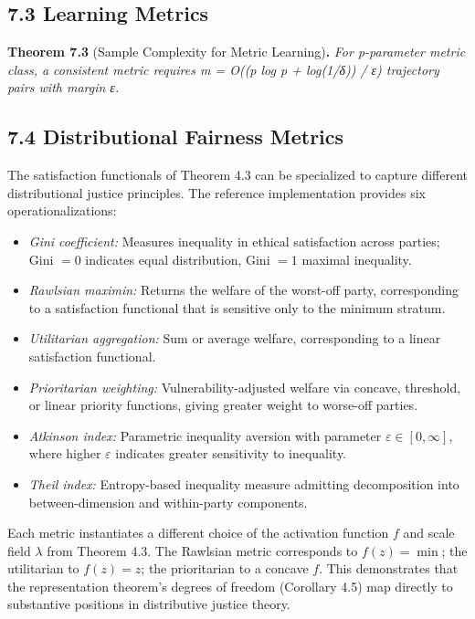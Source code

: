 \documentclass[12pt]{article}
\theoremstyle{plain}
\theoremstyle{definition}
\theoremstyle{remark}
\begin{document}
\subsection{7.3 Learning Metrics}\label{learning-metrics}

\textbf{Theorem 7.3} (Sample Complexity for Metric Learning)\textbf{.}
\emph{For p-parameter metric class, a consistent metric requires m =
O((p log p + log(1/δ)) / ε) trajectory pairs with margin ε.}

\subsection{7.4 Distributional Fairness Metrics}\label{distributional-fairness}

The satisfaction functionals of Theorem 4.3 can be specialized to capture different distributional justice principles. The reference implementation provides six operationalizations:

\begin{itemize}
\item \emph{Gini coefficient:} Measures inequality in ethical satisfaction across parties; Gini $= 0$ indicates equal distribution, Gini $= 1$ maximal inequality.
\item \emph{Rawlsian maximin:} Returns the welfare of the worst-off party, corresponding to a satisfaction functional that is sensitive only to the minimum stratum.
\item \emph{Utilitarian aggregation:} Sum or average welfare, corresponding to a linear satisfaction functional.
\item \emph{Prioritarian weighting:} Vulnerability-adjusted welfare via concave, threshold, or linear priority functions, giving greater weight to worse-off parties.
\item \emph{Atkinson index:} Parametric inequality aversion with parameter $\varepsilon \in [0, \infty]$, where higher $\varepsilon$ indicates greater sensitivity to inequality.
\item \emph{Theil index:} Entropy-based inequality measure admitting decomposition into between-dimension and within-party components.
\end{itemize}

Each metric instantiates a different choice of the activation function $f$ and scale field $\lambda$ from Theorem 4.3. The Rawlsian metric corresponds to $f(z) = \min$; the utilitarian to $f(z) = z$; the prioritarian to a concave $f$. This demonstrates that the representation theorem's degrees of freedom (Corollary 4.5) map directly to substantive positions in distributive justice theory.
\end{document}
